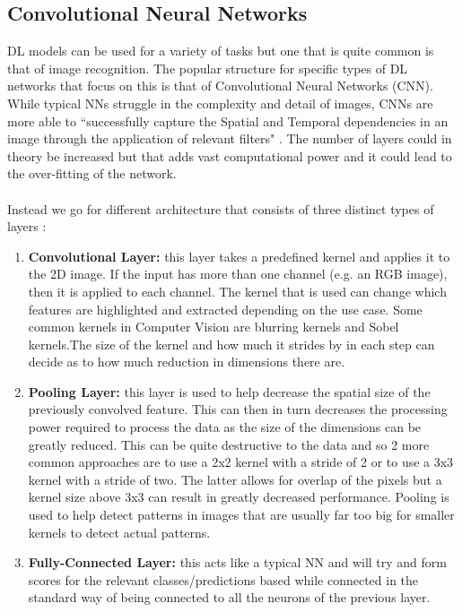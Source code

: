 \subsection{Convolutional Neural Networks}
DL models can be used for a variety of tasks but one that is quite common is that of image recognition. The popular structure for specific types of DL networks that focus on this is that of Convolutional Neural Networks (CNN). While typical NNs struggle in the complexity and detail of images, CNNs are more able to ``successfully capture the Spatial and Temporal dependencies in an image through the application of relevant filters" \cite{eli5_convnet}. The number of layers could in theory be increased but that adds vast computational power and it could lead to the over-fitting of the network. \\ \\
Instead we go for different architecture that consists of three distinct types of layers \cite{convnet}:
\begin{enumerate}
    \item \textbf{Convolutional Layer:} this layer takes a predefined kernel \cite{kernel} and applies it to the 2D image. If the input has more than one channel (e.g. an RGB image), then it is applied to each channel. The kernel that is used can change which features are highlighted and extracted depending on the use case. Some common kernels in Computer Vision are blurring kernels and Sobel kernels.The size of the kernel and how much it strides by in each step can decide as to how much reduction in dimensions there are.
    
    \item \textbf{Pooling Layer:} this layer is used to help decrease the spatial size of the previously convolved feature. This can then in turn decreases the processing power required to process the data as the size of the dimensions can be greatly reduced. This can be quite destructive to the data and so 2 more common approaches are to use a 2x2 kernel with a stride of 2 or to use a 3x3 kernel with a stride of two. The latter allows for overlap of the pixels but a kernel size above 3x3 can result in greatly decreased performance. Pooling is used to help detect patterns in images that are usually far too big for smaller kernels to detect actual patterns.
    
    \item \textbf{Fully-Connected Layer:} this acts like a typical NN and will try and form scores for the relevant classes/predictions based while connected in the standard way of being connected to all the neurons of the previous layer.
\end{enumerate}
